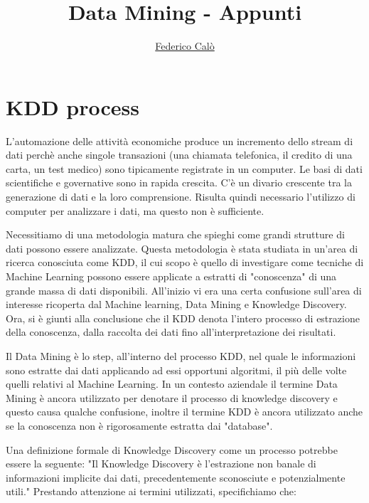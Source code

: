 \documentclass[a4paper]{extarticle}
\title{Data Mining - Appunti}
\author{\href{http://www.federicocalo.dev}{Federico Calò} }
\date{}
\begin{document}
\maketitle
\newpage
\tableofcontents
\voffset -30pt

\newpage

\section{KDD process}

L'automazione delle attività economiche produce un incremento dello stream di dati perchè anche singole transazioni (una chiamata telefonica, il credito di una carta, un test medico) sono tipicamente registrate in un computer.
Le basi di dati scientifiche e governative sono in rapida crescita. C'è un divario crescente tra la generazione di dati e la loro comprensione. Risulta quindi necessario l'utilizzo di computer per analizzare i dati, ma questo non è sufficiente.

Necessitiamo di una metodologia matura che spieghi come grandi strutture di dati possono essere analizzate. Questa metodologia è stata studiata in un'area di ricerca conosciuta come KDD, il cui scopo è quello di investigare come tecniche di Machine Learning possono essere applicate a estratti di "conoscenza" di una grande massa di dati disponibili. All'inizio vi era una certa confusione sull'area di interesse ricoperta dal Machine learning, Data Mining e Knowledge Discovery. Ora, si è giunti alla conclusione che il KDD denota l'intero processo di estrazione della conoscenza, dalla raccolta dei dati fino  all'interpretazione dei risultati.

Il Data Mining è lo step, all'interno del processo KDD, nel quale le informazioni sono estratte dai dati applicando ad essi opportuni algoritmi, il più delle volte quelli relativi al Machine Learning. 
In un contesto aziendale il termine Data Mining è ancora utilizzato per denotare il processo di knowledge discovery e questo causa qualche confusione, inoltre il termine KDD è ancora utilizzato anche se la conoscenza non è rigorosamente estratta dai "database". 

Una definizione formale di Knowledge Discovery come un processo potrebbe essere la seguente: "Il Knowledge Discovery è l'estrazione non banale di informazioni implicite dai dati, precedentemente sconosciute e potenzialmente utili." Prestando attenzione ai termini utilizzati, specifichiamo che:
\end{document}
